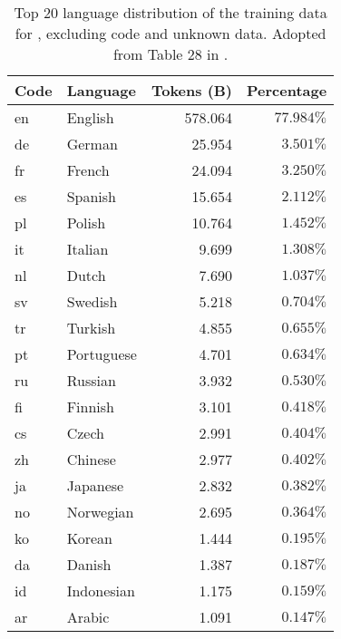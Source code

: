 \begin{table}[!htbp]
    \small
    \centering
    \alternaterowcolors
    \begin{tabular}{llrr}
        \toprule
        \bfseries Code & \bfseries Language & \bfseries Tokens (B) & \bfseries Percentage \\
        \midrule
            en & English & 578.064 & $77.984 \%$ \\
            de & German & 25.954 & $3.501 \%$ \\
            fr & French & 24.094 & $3.250 \%$ \\
            es & Spanish & 15.654 & $2.112 \%$ \\
            pl & Polish & 10.764 & $1.452 \%$ \\
            it & Italian & 9.699 & $1.308 \%$ \\
            nl & Dutch & 7.690 & $1.037 \%$ \\
            sv & Swedish & 5.218 & $0.704 \%$ \\
            tr & Turkish & 4.855 & $0.655 \%$ \\
            pt & Portuguese & 4.701 & $0.634 \%$ \\
            ru & Russian & 3.932 & $0.530 \%$ \\
            fi & Finnish & 3.101 & $0.418 \%$ \\
            cs & Czech & 2.991 & $0.404 \%$ \\
            zh & Chinese & 2.977 & $0.402 \%$ \\
            ja & Japanese & 2.832 & $0.382 \%$ \\
            no & Norwegian & 2.695 & $0.364 \%$ \\
            ko & Korean & 1.444 & $0.195 \%$ \\
            da & Danish & 1.387 & $0.187 \%$ \\
            id & Indonesian & 1.175 & $0.159 \%$ \\
            ar & Arabic & 1.091 & $0.147\%$ \\
        \bottomrule
    \end{tabular}
    \caption{Top 20 language distribution of the training data for \palm, excluding code and unknown data. Adopted from Table 28 in \citet{palm}.}
    \label{tab:palm_top_20_lang}
\end{table}


